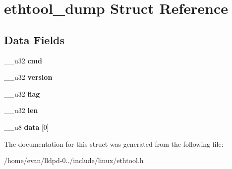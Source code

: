 \section{ethtool\-\_\-dump \-Struct \-Reference}
\label{structethtool__dump}
\subsection*{\-Data \-Fields}
\begin{DoxyCompactItemize}
\item 
\-\_\-\-\_\-u32 {\bfseries cmd}\label{structethtool__dump_a66d231264d5aa36fd7d347e2c967769a}

\item 
\-\_\-\-\_\-u32 {\bfseries version}\label{structethtool__dump_a1c857bd0b02d104bdd57a95e6bbcd9f9}

\item 
\-\_\-\-\_\-u32 {\bfseries flag}\label{structethtool__dump_a7baedaacc7b9f559acaca56ecee79ba6}

\item 
\-\_\-\-\_\-u32 {\bfseries len}\label{structethtool__dump_a6727c6c5c16cc9c9786bfbfd3f30f9a1}

\item 
\-\_\-\-\_\-u8 {\bfseries data} [0]\label{structethtool__dump_a1bfe8b027f6e5624818c1a92b91bf6d2}

\end{DoxyCompactItemize}


\-The documentation for this struct was generated from the following file\-:\begin{DoxyCompactItemize}
\item 
/home/evan/lldpd-\/0../include/linux/ethtool.\-h\end{DoxyCompactItemize}

